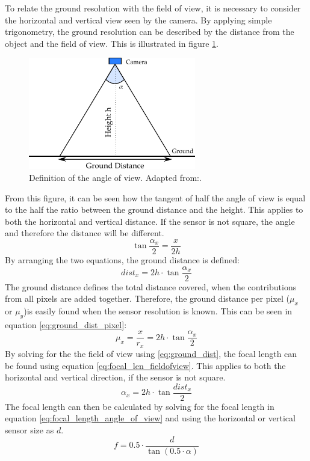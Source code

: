 To relate the ground resolution with the field of view, it is necessary to consider the horizontal and vertical view seen by the camera. By applying simple trigonometry, the ground resolution can be described by the distance from the object and the field of view. This is illustrated in figure \ref{fig:angle_of_view_def}.
\begin{figure}[H]
\centering
\includegraphics[width=0.65\textwidth]{figures/Orbiter/imaging_angle_of_view}
\caption{Definition of the angle of view. Adapted from:\cite{dsil2014}.}
\label{fig:angle_of_view_def}
\end{figure}
From this figure, it can be seen how the tangent of half the angle of view is equal to the half the ratio between the ground distance and the height. This applies to both the horizontal and vertical distance. If the sensor is not square, the angle and therefore the distance will be different.
\begin{equation}
\label{eq:angle_of_view}
\tan{\frac{\alpha_x}{2}} = \frac{x}{2h}
\end{equation}
By arranging the two equations, the ground distance is defined:
\begin{equation}
\label{eq:ground_dist}
dist_x = 2h\cdot \tan{\frac{\alpha_x}{2}}
\end{equation}
The ground distance defines the total distance covered, when the contributions from all pixels are added together. Therefore, the ground distance per pixel ($\mu_x$ or $\mu_y$)is easily found when the sensor resolution is known. This can be seen in equation \eqref{eq:ground_dist_pixel}:
\begin{equation}
\label{eq:ground_dist_pixel}
\mu_x = \frac{x}{r_x} = 2h\cdot \tan{\frac{\alpha_x}{2}}
\end{equation}
By solving for the the field of view using \eqref{eq:ground_dist}, the focal length can be found using equation \eqref{eq:focal_len_fieldofview}. This applies to both the horizontal and vertical direction, if the sensor is not square.
\begin{equation}
\label{eq:angle_of_view_ground_dist}
\alpha_x = 2h\cdot \tan{\frac{dist_x}{2}}
\end{equation}
The focal length can then be calculated by solving for the focal length in equation \eqref{eq:focal_length_angle_of_view} and using the horizontal or vertical sensor size as $d$.
\begin{equation}
\label{eq:focal_length_angle_of_view}
f = 0.5\cdot\frac{d}{\tan{\left(0.5\cdot \alpha\right)}}
\end{equation}
